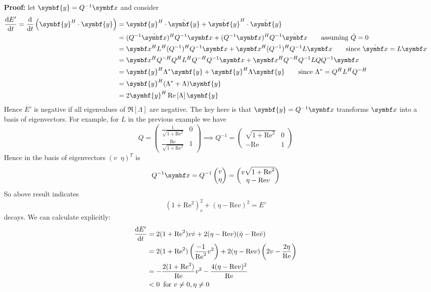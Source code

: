 \documentclass{jknotes}
\newcommand{\ReN}{\text{Re}}
\renewcommand{\y}{\symbf{y}}
\begin{document}
\textbf{Proof:} let $\y = Q^{-1} \x$ and consider 
\begin{align}
	\frac{\diffd E'}{\diffd t} = \frac{\diffd}{\diffd t} \left( \y^H \cdot
	\y\right) &= \y^H \cdot \dot{\y} + \dot{\y}^H \cdot \dot{\y}\\
			  &= (Q^{-1}\dot{\x})^HQ^{-1}\x + (Q^{-1}\x)^H Q^{-1}\dot{\x}
			  \hspace{2em}\text{assuming} \,\, \dot{Q} = 0 \\
			  &= \x^H L^H (Q^{-1})^H Q^{-1}\x + \x^H (Q^{-1})^H Q^{-1} L
			  \x \hspace{2em} \text{since}\,\, \dot{\x}=L\x \\
			  &= \x^H Q^{-H} Q^H L^H Q^{-H} Q^{-1} \x + \x^H Q^{-H} Q^{-1}L Q
			  Q^{-1} \x \\
			  &= \y^H \Lambda^* \y + \y^H \Lambda \y  \hspace{2em}
			  \text{since} \,\, \Lambda^* = Q^H L^H Q^{-H}\\
			  &= \y^H (\Lambda^* + \Lambda) \y \\
			  &= 2\y^H \Re\left[\Lambda\right] \y
\end{align}
Hence $\dot{E'}$ is negative if all eigenvalues of $\Re\left[\Lambda\right]$ are
negative. The key here is that $\y = Q^{-1} \x$ transforms $\x$ into a basis
of eigenvectors.  For example, for $L$ in the previous example we have
\begin{equation}
	Q = \begin{pmatrix} \frac{1}{\sqrt{1+\ReN^2}} & 0 \\
	\frac{\ReN}{\sqrt{1+\ReN^2}} & 1 \end{pmatrix} \implies Q^{-1} =
		\begin{pmatrix} \sqrt{1+\ReN^2} & 0 \\ -\ReN & 1 \end{pmatrix}
\end{equation}
Hence in the basis of eigenvectors $(v \,\,\, \eta)^T$ is
\begin{equation}
	Q^{-1}\x = Q^{-1} \begin{pmatrix} v \\ \eta \end{pmatrix} =
	\begin{pmatrix} v \sqrt{1+\ReN^2} \\ \eta - \ReN v \end{pmatrix}
\end{equation}
So above result indicates 
\begin{equation}
	(1+\ReN^2)_v^2 + (\eta- \ReN v)^2 = E'
\end{equation}
decays. We can calculate explicitly:
\begin{align}
	\frac{\diffd E'}{\diffd t} 
	&= 2(1+\ReN^2)v\dot{v} + 2(\eta-\ReN v)(\dot{\eta} - \ReN \dot{v}) \\
	&= 2 (1+\ReN^2)\left(\frac{-1}{\ReN^2} v^2\right) + 2(\eta - \ReN
	v)\left(2v - \frac{2\eta}{\ReN}\right) \\
	&= -\frac{2(1+\ReN^2)}{\ReN} v^2 - \frac{4(\eta - \ReN v)^2}{\ReN}\\
	&< 0 \,\,\, \text{for} \,\, v \ne 0, \eta \ne 0
\end{align}
\end{document}
